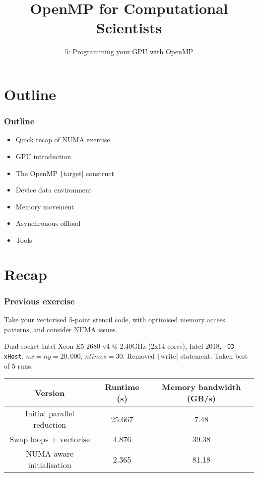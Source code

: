 \documentclass{beamer}
\title{OpenMP for Computational Scientists}
\subtitle{5: Programming your GPU with OpenMP}
\begin{document}
\frame{\titlepage}

\section{Outline}
\begin{frame}
\frametitle{Outline}

\begin{itemize}
  \item Quick recap of NUMA exercise
\end{itemize}

\begin{itemize}
  \item GPU introduction
  \item The OpenMP \texttt|target| construct
  \item Device data environment
  \item Memory movement
  \item Asynchronous offload
  \item Tools
\end{itemize}
\end{frame}

\section{Recap}
\begin{frame}
\frametitle{Previous exercise}

Take your vectorised 5-point stencil code, with optimised memory access patterns, and consider NUMA issues.


Dual-socket Intel Xeon E5-2680 v4 @ 2.40GHz (2x14 cores), Intel 2018, {\tt -O3 -xHost}.
$nx=ny=20,000$, $ntimes=30$. Removed \texttt|write| statement. Taken best of 5 runs.

\begin{table}
\begin{tabular}{ccc}
\toprule
Version & Runtime (s) & Memory bandwidth (GB/s)\\
\midrule
Initial parallel reduction & 25.667 &  7.48 \\
Swap loops + vectorise     &  4.876 & 39.38 \\
NUMA aware initialisation  &  2.365 & 81.18 \\
\bottomrule
\end{tabular}
\end{table}

\end{frame}
\end{document}
